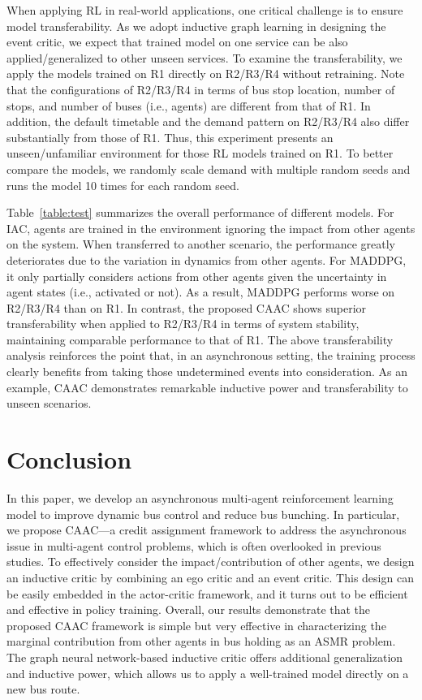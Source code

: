\documentclass{article}
\begin{document}
When applying RL in real-world applications, one critical challenge is to ensure model transferability. As we adopt inductive graph learning in designing the event critic, we expect that trained model on one service can be also applied/generalized to other unseen services. To examine the transferability, we apply the models trained on R1 directly on R2/R3/R4 without retraining. Note that the configurations of R2/R3/R4 in terms of bus stop location, number of stops, and number of buses (i.e., agents) are different from that of R1. In addition, the default timetable and the demand pattern on R2/R3/R4 also differ substantially from those of R1. Thus, this experiment presents an unseen/unfamiliar environment for those RL models trained on R1. To better compare the models, we randomly scale demand with multiple random seeds and runs the model 10 times for each random seed.

Table~\ref{table:test} summarizes the overall performance of different models. For IAC, agents are trained in the environment ignoring the impact from other agents on the system. When transferred to another scenario, the performance greatly deteriorates due to the variation in dynamics from other agents. For MADDPG, it only partially considers actions from other agents given the uncertainty in agent states (i.e., activated or not). As a result, MADDPG performs worse on R2/R3/R4 than on R1. In contrast, the proposed CAAC shows superior transferability when applied to R2/R3/R4 in terms of system stability, maintaining comparable performance to that of R1. The above transferability analysis reinforces the point that, in an asynchronous setting, the training process clearly benefits from taking those undetermined events into consideration. As an example, CAAC demonstrates remarkable inductive power and transferability to unseen scenarios.




\section{Conclusion}


In this paper, we develop an asynchronous multi-agent reinforcement learning model to improve dynamic bus control and reduce bus bunching. In particular, we propose CAAC---a credit assignment framework to address the asynchronous issue in multi-agent control problems, which is often overlooked in previous studies. To effectively consider the impact/contribution of other agents, we design an inductive critic by combining an ego critic and an event critic. This design can be easily embedded in the actor-critic framework, and it turns out to be efficient and effective in policy training. Overall, our results demonstrate that the proposed CAAC framework is simple but very effective in characterizing the marginal contribution from other agents in bus holding as an ASMR problem. The graph neural network-based inductive critic offers additional generalization and inductive power, which allows us to apply a well-trained model directly on a new bus route.
\end{document}
